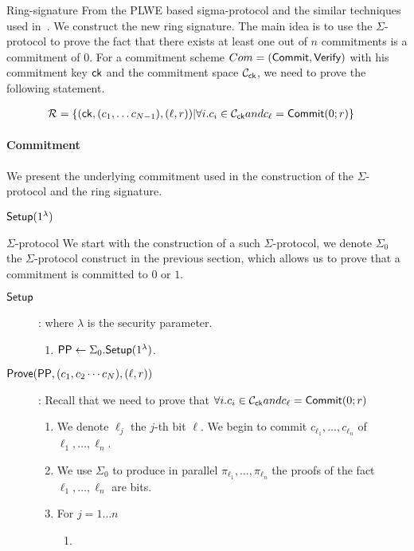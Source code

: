 \begin{subsection}{Ring-signature}
  From the PLWE based sigma-protocol and
  the similar techniques used in~\cite{DBLP:conf/eurocrypt/GrothK15}.
  We construct the new ring signature.
  The main idea is to use the $\Sigma$-protocol to prove the fact that
  there exists at least one out of $n$ commitments is a commitment of $0$.
  For a commitment scheme $Com = ({\mathsf{Commit}}, {\mathsf{Verify}})$ with his commitment key $\mathsf{ck}$
  and the commitment space $\mathcal{C}_{\mathsf{ck}}$,
  we need to prove the following statement.

  \begin{align*}
    \mathcal{R} &= \{(\mathsf{ck}, (c_1, \dots c_{N-1}), (\ell, r)) | \forall i. c_i \in \mathcal{C}_{\mathsf{ck}} and c_\ell = {\mathsf{Commit}}(0; r)\}
  \end{align*}


  \paragraph{Commitment}
  We present the underlying commitment used in the construction of the $\Sigma$-protocol
  and the ring signature.
  \begin{description}
    \item [${\mathsf{Setup}}(1^\lambda)$] 
  \end{description}

  \begin{paragraph}{$\Sigma$-protocol}
    We start with the construction of a such $\Sigma$-protocol,
    we denote $\Sigma_0$ the $\Sigma$-protocol construct in the previous section,
    which allows us to prove that a commitment is committed to $0$ or $1$.
    \begin{description}
      \item[${\mathsf{Setup}}$]: where $\lambda$ is the security parameter.
        \begin{enumerate}
          \item ${\mathsf{PP}} \gets \Sigma_0.{\mathsf{Setup}}(1^\lambda)$.
        \end{enumerate}
        \item[${\mathsf{Prove}}({\mathsf{PP}}, (c_1, c_2 \cdots c_N), (\ell, r))$]:
        Recall that we need to prove that $\forall i. c_i \in \mathcal{C}_{\mathsf{ck}} and c_\ell = {\mathsf{Commit}}(0; r)$
        \begin{enumerate}
          \item We denote $\ell_j$ the $j$-th bit $\ell$. We begin to commit $c_{\ell_1}, \dots, c_{\ell_n}$ of $\ell_1, \dots, \ell_n$.
          \item We use $\Sigma_0$ to produce in parallel $\pi_{\ell_1}, \dots, \pi_{\ell_n}$ the proofs of the fact $\ell_1, \dots, \ell_n$ are bits.
          \item For $j = 1 \dots n$
          \begin{enumerate}
            \item
          \end{enumerate}


\end{enumerate}
\end{description}
\end{paragraph}
\end{subsection}
